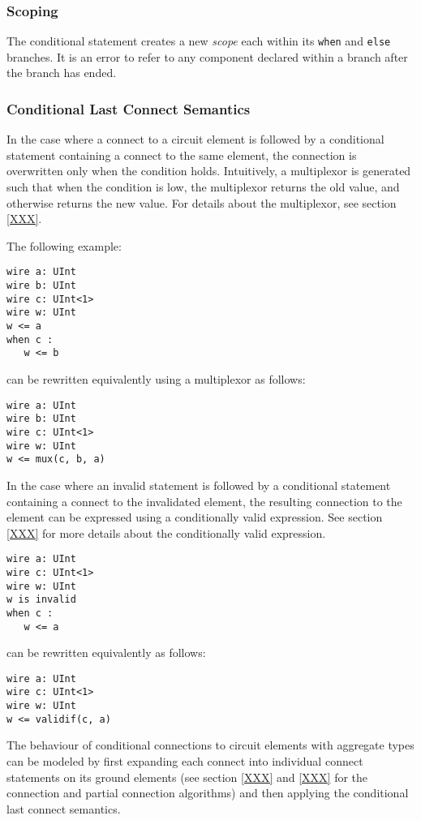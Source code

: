 \documentclass[12pt]{article}
\begin{document}
\subsubsection{Scoping}
The conditional statement creates a new {\em scope} each within its \verb|when| and \verb|else| branches. It is an error to refer to any component declared within a branch after the branch has ended.

\subsubsection{Conditional Last Connect Semantics}
In the case where a connect to a circuit element is followed by a conditional statement containing a connect to the same element, the connection is overwritten only when the condition holds. Intuitively, a multiplexor is generated such that when the condition is low, the multiplexor returns the old value, and otherwise returns the new value. For details about the multiplexor, see section \ref{XXX}.

The following example:
\begin{verbatim}
wire a: UInt
wire b: UInt
wire c: UInt<1>
wire w: UInt
w <= a
when c :
   w <= b
\end{verbatim}
can be rewritten equivalently using a multiplexor as follows:
\begin{verbatim}
wire a: UInt
wire b: UInt
wire c: UInt<1>
wire w: UInt
w <= mux(c, b, a)
\end{verbatim}

In the case where an invalid statement is followed by a conditional statement containing a connect to the invalidated element, the resulting connection to the element can be expressed using a conditionally valid expression. See section \ref{XXX} for more details about the conditionally valid expression.
\begin{verbatim}
wire a: UInt
wire c: UInt<1>
wire w: UInt
w is invalid
when c :
   w <= a
\end{verbatim}
can be rewritten equivalently as follows:
\begin{verbatim}
wire a: UInt
wire c: UInt<1>
wire w: UInt
w <= validif(c, a)
\end{verbatim}

The behaviour of conditional connections to circuit elements with aggregate types can be modeled by first expanding each connect into individual connect statements on its ground elements (see section \ref{XXX} and \ref{XXX} for the connection and partial connection algorithms) and then applying the conditional last connect semantics.
\end{document}
